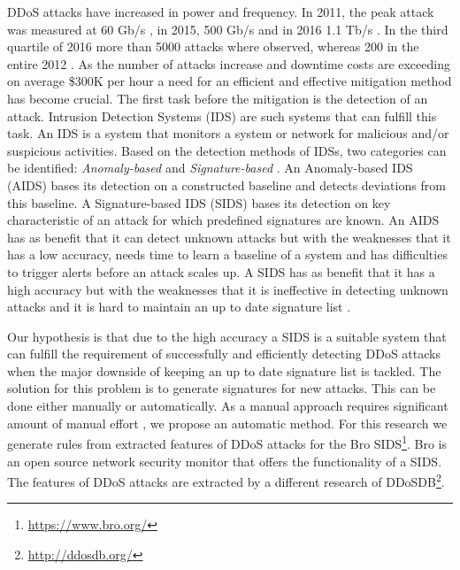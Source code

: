 DDoS attacks have increased in power and frequency. In 2011, the peak attack was measured at 60 Gb/s \cite{Arbor2014}, in 2015, 500 Gb/s and in 2016 1.1 Tb/s \cite{Akamai2017}. In the third quartile of 2016 more than 5000 attacks where observed, whereas 200 in the entire 2012 \cite{Akamai2016}. As the number of attacks increase and downtime costs are exceeding on average \$300K per hour \cite{ITIC2016} a need for an efficient and effective mitigation method has become crucial. The first task before the mitigation is the detection of an attack. Intrusion Detection Systems (IDS) are such systems that can fulfill this task. An IDS is a system that monitors a system or network for malicious and/or suspicious activities. 
Based on the detection methods of IDSs, two categories can be identified: \textit{Anomaly-based} and \textit{Signature-based} \cite{fragkiadakis2015anomaly}. An Anomaly-based IDS (AIDS) bases its detection on a constructed baseline and detects deviations from this baseline. A Signature-based IDS (SIDS) bases its detection on key characteristic of an attack for which predefined signatures are known. An AIDS has as benefit that it can detect unknown attacks but with the weaknesses that it has a low accuracy, needs time to learn a baseline of a system and has difficulties to trigger alerts before an attack scales up. A SIDS has as benefit that it has a high accuracy but with the weaknesses that it is ineffective in detecting unknown attacks and it is hard to maintain an up to date signature list \cite{Liao2013}. 

Our hypothesis is that due to the high accuracy a SIDS is a suitable system that can fulfill the requirement of successfully and efficiently detecting DDoS attacks when the major downside of keeping an up to date signature list is tackled. The solution for this problem is to generate signatures for new attacks. This can be done either manually or automatically. As a manual approach requires significant amount of manual effort \cite{Lin2013}, we propose an automatic method. For this research we generate rules from extracted features of DDoS attacks for the Bro SIDS\footnote{\url{https://www.bro.org/}}. Bro is an open source network security monitor that offers the functionality of a SIDS. The features of DDoS attacks are extracted by a different research of DDoSDB\footnote{\url{http://ddosdb.org/}}.

